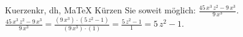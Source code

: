 \begin{MAufgabe}{Kuerzen}{kr, dh, MaTeX}
K\"urzen Sie soweit m\"oglich: $\frac{45\, x^3\, z^2 - 9\, x^3}{9\, x^3}$.\\ 
\ifLsg\MLoesung
\quad $\frac{45\, x^3\, z^2 - 9\, x^3}{9\, x^3}=\frac{(9\, x^3)\cdot(5\, z^2 - 1)}{(9\, x^3)\cdot(1)}=\frac{5\, z^2 - 1}{1}=5\, z^2 - 1$.\else\relax\fi
 \end{MAufgabe}
